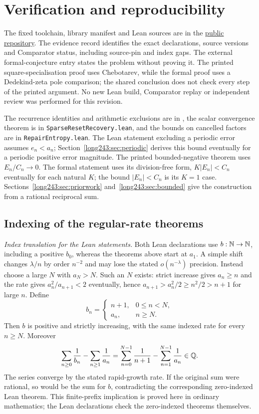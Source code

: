 \documentclass[11pt]{article}
\begin{document}
\section{Verification and reproducibility}\label{long243:app:index}
\evidenceparagraph{\evidencerecordurl}
The fixed toolchain, library manifest and Lean sources are in the
\href{\sourceurl}{public repository}. The evidence record identifies
the exact declarations, source versions and Comparator status, including
source-pin and index gaps. The external formal-conjecture entry states
the problem without proving it. The printed square-specialisation proof
uses Chebotarev, while the formal proof uses a Dedekind-zeta pole comparison;
the shared conclusion does not check every step of the printed argument.
No new Lean build, Comparator replay or independent review was performed
for this revision.


The recurrence identities
and arithmetic exclusions are in , the
scalar convergence theorem is in \texttt{SparseResetRecovery.lean}, and
the bounds on cancelled factors are in \texttt{RepairEntropy.lean}.
The Lean statement excluding a periodic error assumes $e_n<a_n$;
Section~\ref{long243:sec:periodic} derives this bound eventually for a
periodic positive error magnitude. The printed bounded-negative theorem uses $E_n/C_n\to0$. The
formal statement uses its division-free form, $K|E_n|<C_n$ eventually
for each natural $K$; the bound $|E_n|<C_n$ is its $K=1$ case.
Sections~\ref{long243:sec:priorwork} and~\ref{long243:sec:bounded} give the
construction from a rational reciprocal sum.

\subsection*{Indexing of the regular-rate theorems}
\noindent\emph{Index translation for the Lean statements.} Both Lean
declarations use $b:\mathbb{N}\to\mathbb{N}$, including a positive $b_0$, whereas the
theorems above start at $a_1$. A simple shift changes $\lambda/n$ by
order $n^{-2}$ and may lose the stated $o(n^{-\lambda})$ precision.
Instead choose a
large $N$ with $a_N>N$. Such an $N$ exists: strict increase gives
$a_n\ge n$ and the rate gives $a_n^2/a_{n+1}<2$ eventually, hence
$a_{n+1}>a_n^2/2\ge n^2/2>n+1$ for large $n$. Define
\[
 b_n=\begin{cases}n+1,&0\le n<N,\\a_n,&n\ge N.\end{cases}
\]
Then $b$ is positive and strictly increasing, with the same indexed rate
for every $n\ge N$. Moreover
\[
 \sum_{n\ge0}\frac1{b_n}-\sum_{n\ge1}\frac1{a_n}
 =\sum_{n=0}^{N-1}\frac1{n+1}-\sum_{n=1}^{N-1}\frac1{a_n}\in\mathbb{Q}.
\]
The series converge by the stated rapid-growth rate. If the original
sum were rational, so would be the sum for $b$, contradicting the
corresponding zero-indexed Lean theorem. This finite-prefix implication
is proved here in ordinary mathematics; the Lean declarations check the
zero-indexed theorems themselves.
\end{document}
